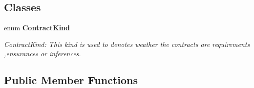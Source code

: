 \subsection*{Classes}
\begin{DoxyCompactItemize}
\item 
enum {\bfseries Contract\+Kind}
\begin{DoxyCompactList}\small\item\em Contract\+Kind\+: This kind is used to denotes weather the contracts are requirements ,ensurances or inferences. \end{DoxyCompactList}\end{DoxyCompactItemize}
\subsection*{Public Member Functions}
